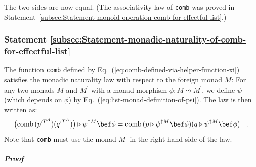 The two sides are now equal. (The associativity law of \lstinline!comb!
was proved in Statement~\ref{subsec:Statement-monoid-operation-comb-for-effectful-list}.)

\subsubsection{Statement \label{subsec:Statement-monadic-naturality-of-comb-for-effectful-list}\ref{subsec:Statement-monadic-naturality-of-comb-for-effectful-list}}

The function \lstinline!comb! defined by Eq.~(\ref{eq:comb-defined-via-helper-function-xi})
satisfies the monadic naturality law with respect to the foreign monad
$M$: For any two monads $M$ and $M^{\prime}$ with a monad morphism
$\phi:M\leadsto M^{\prime}$, we define $\psi$ (which depends on
$\phi$) by Eq.~(\ref{eq:list-monad-definition-of-psi}). The law
is then written as:
\[
\big(\text{comb}\,(p^{:T^{A}})(q^{:T^{A}})\big)\triangleright\psi^{\uparrow M}\bef\phi=\text{comb}\,(p\triangleright\psi^{\uparrow M}\bef\phi)(q\triangleright\psi^{\uparrow M}\bef\phi)\quad.
\]
Note that \lstinline!comb! must use the monad $M^{\prime}$ in the
right-hand side of the law.

\subparagraph{Proof}

